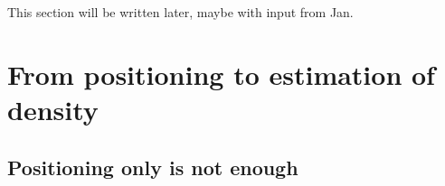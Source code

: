 \documentclass[10pt,a4paper]{article}
\begin{document}
This section will be written later, maybe with input from Jan.

\section{From positioning to estimation of density}
\label{sec:density}


\subsection{Positioning only is not enough}
\end{document}
